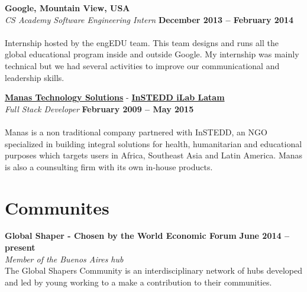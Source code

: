 \documentclass[margin,line]{resume}
\begin{document}
\begin{resume}
\textbf{Google, Mountain View, USA}\vspace{2mm}\\\vspace{1mm}
\textsl{CS Academy Software Engineering Intern} \hfill \textbf{December 2013 -- February 2014}\vspace{-3mm}\\\vspace{-1mm}
\\
Internship hosted by the engEDU team. This team designs and runs all the global educational program inside and outside Google. My internship was mainly technical but we had several activities to improve our communicational and leadership skills.

\textbf{\href{http://www.manas.com.ar/}{Manas Technology Solutions}} - 
\textbf{\href{http://www.instedd.org/}{InSTEDD iLab Latam}}\vspace{2mm}\\\vspace{1mm}
\textsl{Full Stack Developer} \hfill \textbf{February 2009 -- May 2015}\vspace{-3mm}\\\vspace{-1mm}
\\
Manas is a non traditional company partnered with InSTEDD, an NGO specialized in building integral solutions for health, humanitarian and educational purposes which targets users in Africa, Southeast Asia and Latin America. Manas is also a counsulting firm with its own in-house products.
\newpage


\section{\mysidestyle Communites}

\textbf{Global Shaper - Chosen by the World Economic Forum} \hfill \textbf{June 2014 -- present} \vspace{2mm}\\\vspace{1mm}
\textsl{Member of the Buenos Aires hub} \\
The Global Shapers Community is an interdisciplinary network of hubs developed and led by young  working to a make a contribution to their communities.



\end{resume}
\end{document}
